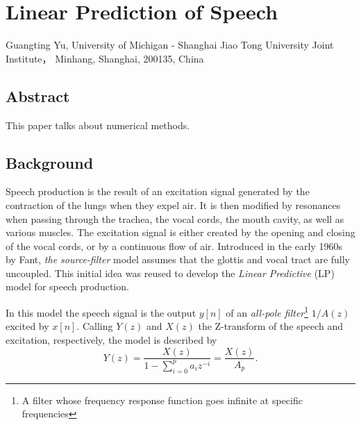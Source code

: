 \titleformat{\section}{\normalfont\large\bfseries}{\thesection}{1em}{}
\renewcommand{\chaptername}{Project}
\renewcommand{\thesection}{\arabic{section}}



\chapter{Linear Prediction of Speech}
\begin{center}
Guangting Yu, University of Michigan - Shanghai Jiao Tong University Joint Institute， Minhang, Shanghai, 200135, China
\end{center}


\section*{Abstract}
This paper talks about numerical methods.



\section{Background}
Speech production is the result of an excitation signal generated by the contraction of the lungs when they expel air.\cite{dutoit}
It is then modified by resonances when passing through the trachea, the vocal cords, the mouth cavity, as well as various muscles.\cite{tam59}
The excitation signal is either created by the opening and closing of the vocal cords, or by a continuous flow of air.\cite{gtm181}
Introduced in the early 1960s by Fant, \textit{the source-filter} model assumes that the glottis and vocal tract are fully uncoupled.\cite{corless}
This initial idea was reused to develop the \textit{Linear Predictive} (LP) model for speech production.\cite{tam39}

In this model the speech signal is the output \(y[n]\) of an \textit{all-pole filter}\footnote{A filter whose frequency response function goes infinite at specific frequencies} \(1/A(z)\) excited by \(x[n]\).\cite{golan}
Calling \(Y(z)\) and \(X(z)\) the Z-transform of the speech and excitation, respectively, the model is described by\cite{utm}
\begin{equation}
Y(z)=\frac{X(z)}{1-\sum_{i=0}^p a_i z^{-i}}=\frac{X(z)}{A_p}.
\end{equation}

